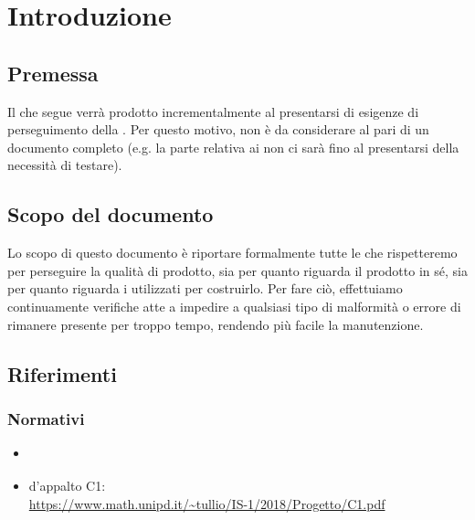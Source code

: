 \section{Introduzione}\label{Introduzione}

	
	

    \subsection{Premessa}
    Il  che segue verrà prodotto incrementalmente al presentarsi di esigenze di perseguimento della .
    Per questo motivo, non è da considerare al pari di un documento completo (e.g. la parte relativa ai non ci sarà fino
    al presentarsi della necessità di testare).

    \subsection{Scopo del documento}
    Lo scopo di questo documento è riportare formalmente tutte le  che rispetteremo per perseguire
    la qualità di prodotto, sia per quanto riguarda il prodotto in s\'e, sia per quanto riguarda i 
    utilizzati per costruirlo. Per fare ciò, effettuiamo continuamente verifiche atte a impedire a qualsiasi tipo di malformità o errore
    di rimanere presente per troppo tempo, rendendo più facile la manutenzione.

    


    \subsection{Riferimenti}
	
	\subsubsection{Normativi}
    \begin{itemize}
    	\item \textit{\NdPv}
    	\item {} d'appalto C1:\\ \url{https://www.math.unipd.it/~tullio/IS-1/2018/Progetto/C1.pdf}
    \end{itemize}
    
